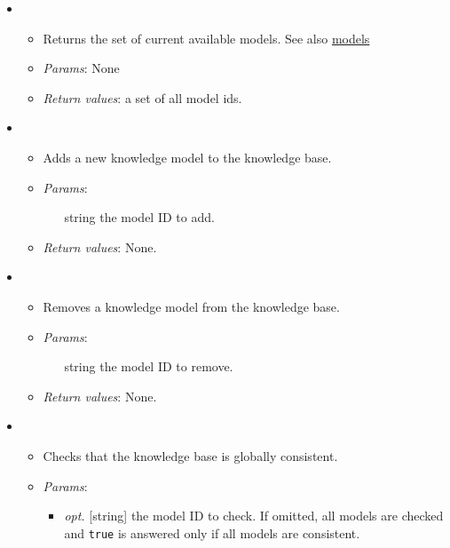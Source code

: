 \begin{itemize}
\item  {}
\begin{itemize}
\item  Returns the set of current available models. See also \hyperref[ac5552fd6a3c08ad22387efbe42d137d]{models}
\item  \emph{Params}: None
\item  \emph{Return values}: a set of all model ids.
\end{itemize}

\item  {}
\begin{itemize}
\item  Adds a new knowledge model to the knowledge base.
\item  \emph{Params}:
\begin{itemize}
\item  [string] the model ID to add.
\end{itemize}

\item  \emph{Return values}: None.
\end{itemize}

\item  {}
\begin{itemize}
\item  Removes a knowledge model from the knowledge base.
\item  \emph{Params}:
\begin{itemize}
\item  [string] the model ID to remove.
\end{itemize}

\item  \emph{Return values}: None.
\end{itemize}

\item  {}
\begin{itemize}
\item  Checks that the knowledge base is globally consistent.
\item  \emph{Params}:
\begin{itemize}
\item  \emph{opt.} [string] the model ID to check. If omitted, all models are checked and \texttt{true} is answered only if all models are consistent. 
\end{itemize}


\end{itemize}
\end{itemize}

